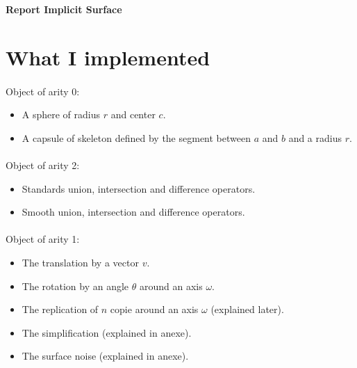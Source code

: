\documentclass[a4paper,12pt]{article}
\date{\today}
\begin{document}
\pagestyle{fancy}
\begin{center}
\textbf{\huge Report Implicit Surface}
\end{center}

\pagestyle{fancy}


\begin{figure}[!h]
\null\hfill
{}
\hfill
{}
\hfill
\end{figure}



\section*{What I implemented}

\paragraph{} Object of arity 0:
\begin{itemize}
	\item A sphere of radius $r$ and center $c$.
	\item A capsule of skeleton defined by the segment between $a$ and $b$ and a radius $r$.
\end{itemize}

\paragraph{} Object of arity 2:	

\begin{itemize}
	\item Standards union, intersection and difference operators.
	\item Smooth union, intersection and difference operators.
\end{itemize}

\paragraph{} Object of arity 1:
\begin{itemize}
	\item The translation by a vector $v$.
	\item The rotation by an angle $\theta$ around an axis $\omega$.
	\item The replication of $n$ copie around an axis $\omega$ (explained later).
	\item The simplification (explained in anexe).
	\item The surface noise\cite{lagae2009procedural} (explained in anexe).
\end{itemize}
\end{document}
